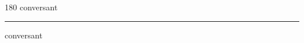
\begin{frame}
\begin{center}
\begin{turn}{180}
{\fontsize{2.5cm}{1em}\selectfont conversant}
\end{turn}
\vspace{1em}\par  
\hrule
\vspace{1em}\par  
{\fontsize{2.5cm}{1em}\selectfont conversant}
\end{center}
\end{frame}
